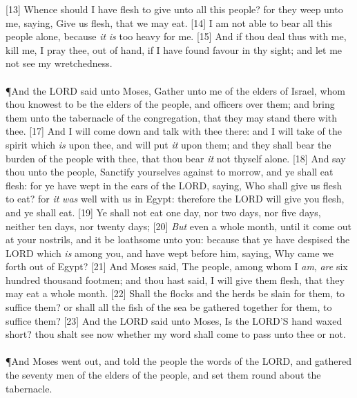 [13] \textcolor[cmyk]{0.99998,1,0,0}{Whence should I have flesh to give unto all this people? for they weep unto me, saying, Give us flesh, that we may eat.}
[14] \textcolor[cmyk]{0.99998,1,0,0}{I am not able to bear all this people alone, because \emph{it} \emph{is} too heavy for me.}
[15] \textcolor[cmyk]{0.99998,1,0,0}{And if thou deal thus with me, kill me, I pray thee, out of hand, if I have found favour in thy sight; and let me not see my wretchedness.}\\
\\
\P \textcolor[cmyk]{0.99998,1,0,0}{And the LORD said unto Moses, Gather unto me  of the elders of Israel, whom thou knowest to be the elders of the people, and officers over them; and bring them unto the tabernacle of the congregation, that they may stand there with thee.}
[17] \textcolor[cmyk]{0.99998,1,0,0}{And I will come down and talk with thee there: and I will take of the spirit which \emph{is} upon thee, and will put \emph{it} upon them; and they shall bear the burden of the people with thee, that thou bear \emph{it} not thyself alone.}
[18] \textcolor[cmyk]{0.99998,1,0,0}{And say thou unto the people, Sanctify yourselves against to morrow, and ye shall eat flesh: for ye have wept in the ears of the LORD, saying, Who shall give us flesh to eat? for \emph{it} \emph{was} well with us in Egypt: therefore the LORD will give you flesh, and ye shall eat.}
[19] \textcolor[cmyk]{0.99998,1,0,0}{Ye shall not eat one day, nor two days, nor five days, neither ten days, nor twenty days;}
[20] \textcolor[cmyk]{0.99998,1,0,0}{\emph{But} even a whole month, until it come out at your nostrils, and it be loathsome unto you: because that ye have despised the LORD which \emph{is} among you, and have wept before him, saying, Why came we forth out of Egypt?}
[21] \textcolor[cmyk]{0.99998,1,0,0}{And Moses said, The people, among whom I \emph{am}, \emph{are} six hundred thousand footmen; and thou hast said, I will give them flesh, that they may eat a whole month.}
[22] \textcolor[cmyk]{0.99998,1,0,0}{Shall the flocks and the herds be slain for them, to suffice them? or shall all the fish of the sea be gathered together for them, to suffice them?}
[23] \textcolor[cmyk]{0.99998,1,0,0}{And the LORD said unto Moses, Is the LORD'S hand waxed short? thou shalt see now whether my word shall come to pass unto thee or not.}\\
\\
\P \textcolor[cmyk]{0.99998,1,0,0}{And Moses went out, and told the people the words of the LORD, and gathered the seventy men of the elders of the people, and set them round about the tabernacle.}
